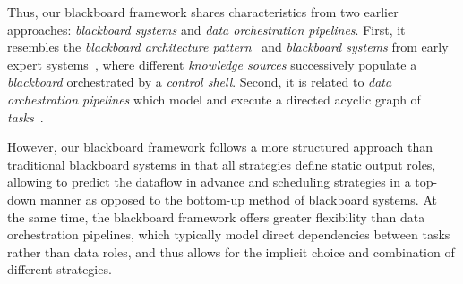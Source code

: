 Thus, our blackboard framework shares characteristics from two earlier approaches: \emph{blackboard systems} and \emph{data orchestration pipelines}.
First, it resembles the \emph{blackboard architecture pattern}~\cite[p.~71ff.]{buschmann1996pattern} and \emph{blackboard systems} from early expert systems~\cite{hayes1985blackboard}, where different \emph{knowledge sources} successively populate a \emph{blackboard} orchestrated by a \emph{control shell}.
Second, it is related to \emph{data orchestration pipelines} which model and execute a directed acyclic graph of \emph{tasks}~\cite{talia2013workflow}.

However, our blackboard framework follows a more structured approach than traditional blackboard systems in that all strategies define static output roles, allowing to predict the dataflow in advance and scheduling strategies in a top-down manner as opposed to the bottom-up method of blackboard systems.
At the same time, the blackboard framework offers greater flexibility than data orchestration pipelines, which typically model direct dependencies between tasks rather than data roles, and thus allows for the implicit choice and combination of different strategies.
